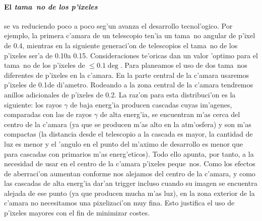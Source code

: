 \paragraph{El \emph{tama~no de los p'ixeles}} se va reduciendo poco a
poco seg'un avanza el desarrollo tecnol'ogico. Por ejemplo, la primera 
c'amara de un telescopio \HEGRA ten'ia un tama~no angular de p'ixel de 
0.4\deg, mientras en la siguiente generaci'on de telescopios
\Cherenkov el tama~no de los p'ixeles ser'a de 0.10\deg a
0.15\deg. Consideraciones te'oricas dan un valor 'optimo para el
tama~no de los p'ixeles de $\leq 0.1\deg$. Para \MAGIC planeamos el
uso de dos tama~nos diferentes de p'ixeles en la c'amara. En la parte
central de la c'amara usaremos p'ixeles de 0.1\deg de
di'ametro. Rodeando a la zona central de la c'amara tendremos anillos
adicionales de p'ixeles de 0.2\deg. La raz'on para esta distribuci'on
es la siguiente: los rayos $\gamma$ de baja energ'ia producen cascadas
cuyas im'agenes, comparadas con las de rayos $\gamma$ de alta
energ'ia, se encuentran m'as cerca del centro de la c'amara (ya que se
producen m'as alto en la atm'osfera) y son m'as compactas (la
distancia desde el telescopio a la cascada es mayor, la cantidad de
luz es menor y el 'angulo \Cherenkov en el punto del m'aximo de
desarrollo es menor que para cascadas con primarios m'as
energ'eticos). Todo ello apunta, por tanto, a la necesidad de usar en
el centro de la c'amara p'ixeles peque~nos. Como los efectos de
aberraci'on aumentan conforme nos alejamos del centro de la c'amara, y 
como las cascadas de alta energ'ia dar'an trigger incluso cuando su
imagen se encuentra alejada de ese punto (ya que producen mucha m'as
luz), en la zona exterior de la c'amara no necesitamos una
pixelizaci'on muy fina. Esto justifica el uso de p'ixeles mayores con
el fin de minimizar costes.

\mirrorsandwichfig

